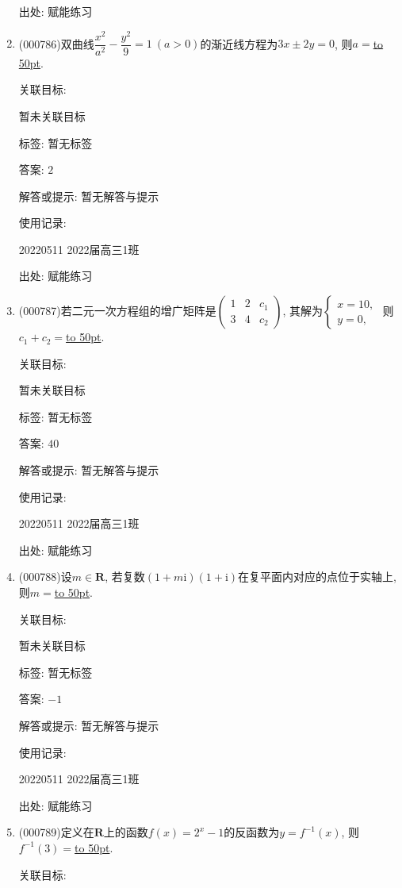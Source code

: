 \documentclass[10pt,a4paper]{article}
\newcommand{\blank}[1]{\underline{\hbox to #1pt{}}}
\begin{document}
\begin{enumerate}[1.]
出处: 赋能练习
\item { (000786)}双曲线$\dfrac{x^2}{a^2}-\dfrac{y^2}9=1 \ (a>0)$的渐近线方程为$3x\pm 2y=0$, 则$a=$\blank{50}.


关联目标:

暂未关联目标



标签: 暂无标签

答案: $2$

解答或提示: 暂无解答与提示

使用记录:

20220511	2022届高三1班	


出处: 赋能练习
\item { (000787)}若二元一次方程组的增广矩阵是$\begin{pmatrix} 1 & 2 & c_1  \\ 3 & 4 & c_2 \end{pmatrix}$, 其解为$\begin{cases} x=10, \\ y=0, \end{cases}$ 则$c_1+c_2=$\blank{50}.


关联目标:

暂未关联目标



标签: 暂无标签

答案: $40$

解答或提示: 暂无解答与提示

使用记录:

20220511	2022届高三1班	


出处: 赋能练习
\item { (000788)}设$m\in \mathbf{R}$, 若复数$(1+m\mathrm{i})(1+\mathrm{i})$在复平面内对应的点位于实轴上, 则$m=$\blank{50}.


关联目标:

暂未关联目标



标签: 暂无标签

答案: $-1$

解答或提示: 暂无解答与提示

使用记录:

20220511	2022届高三1班	


出处: 赋能练习
\item { (000789)}定义在$\mathbf{R}$上的函数$f(x)=2^x-1$的反函数为$y=f^{-1}(x)$, 则$f^{-1}(3)=$\blank{50}.


关联目标:


\end{enumerate}
\end{document}
